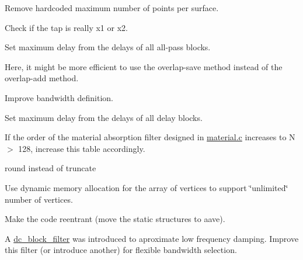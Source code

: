 \begin{DoxyRefList}
\item[\label{todo__todo000004}%
\hypertarget{todo__todo000004}{}%
Global \hyperlink{structaave__surface_a6bd0e3127c052c7cf3ffa49480acda83}{aave\-\_\-surface\-:\-:points} \mbox{[}32\mbox{]}\mbox{[}3+2\mbox{]}]Remove hardcoded maximum number of points per surface.  
\item[\label{todo__todo000013}%
\hypertarget{todo__todo000013}{}%
Global \hyperlink{reverb__dattorro_8c_a63533538546edde6ae7f3c88192ae6a3}{allpass} (struct allpass $\ast$ap, float x, float g, unsigned delay)]Check if the tap is really x1 or x2.  
\item[\label{todo__todo000015}%
\hypertarget{todo__todo000015}{}%
Global \hyperlink{structallpass_a9a88e7125eb10d734a1a408c26cebe49}{allpass\-:\-:buffer} \mbox{[}2656\mbox{]}]Set maximum delay from the delays of all all-\/pass blocks.  
\item[\label{todo__todo000005}%
\hypertarget{todo__todo000005}{}%
File \hyperlink{audio_8c}{audio.c} ]Here, it might be more efficient to use the overlap-\/save method instead of the overlap-\/add method. 
\item[\label{todo__todo000017}%
\hypertarget{todo__todo000017}{}%
Class \hyperlink{structdc__block__filter}{dc\-\_\-block\-\_\-filter} ]Improve bandwidth definition.  
\item[\label{todo__todo000014}%
\hypertarget{todo__todo000014}{}%
Global \hyperlink{structdelay_a655d8b9f8d1bcd90764042b7e6e58ea7}{delay\-:\-:buffer} \mbox{[}16384\mbox{]}]Set maximum delay from the delays of all delay blocks.  
\item[\label{todo__todo000006}%
\hypertarget{todo__todo000006}{}%
Global \hyperlink{dftindex_8c_ad9fc4c6b2778357224f5341cf268f78c}{dft\-\_\-index\-\_\-table} \mbox{[}\mbox{]}]If the order of the material absorption filter designed in \hyperlink{material_8c}{material.\-c} increases to N $>$ 128, increase this table accordingly.  
\item[\label{todo__todo000010}%
\hypertarget{todo__todo000010}{}%
Global \hyperlink{idft_8h_a797484e3f3d53d566ececbcfcd90f537}{idft} (I\-D\-F\-T\-\_\-\-T\-Y\-P\-E $\ast$x, float $\ast$\-X, unsigned n)]round instead of truncate  
\item[\label{todo__todo000011}%
\hypertarget{todo__todo000011}{}%
Global \hyperlink{obj_8c_a0fdb7b933ef091574ff57d1f36dd4167}{M\-A\-X\-\_\-\-V\-E\-R\-T\-I\-C\-E\-S} ]Use dynamic memory allocation for the array of vertices to support \char`\"{}unlimited\char`\"{} number of vertices.  
\item[\label{todo__todo000012}%
\hypertarget{todo__todo000012}{}%
File \hyperlink{reverb__dattorro_8c}{reverb\-\_\-dattorro.c} ]Make the code reentrant (move the static structures to aave). 
\item[\label{todo__todo000016}%
\hypertarget{todo__todo000016}{}%
File \hyperlink{reverb__jot_8c}{reverb\-\_\-jot.c} ]A {\ttfamily \hyperlink{structdc__block__filter}{dc\-\_\-block\-\_\-filter}} was introduced to aproximate low frequency damping. Improve this filter (or introduce another) for flexible bandwidth selection. 
\end{DoxyRefList}